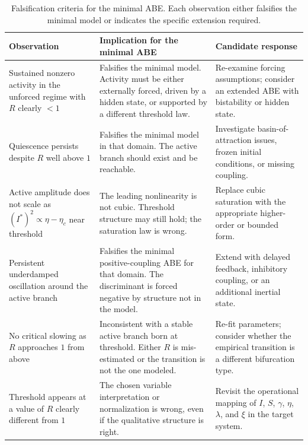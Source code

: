 \documentclass[11pt]{article}
\begin{document}
\begin{table}[H]
\centering
\small
\caption{Falsification criteria for the minimal ABE. Each observation either falsifies the minimal model or indicates the specific extension required.}
\label{tab:falsification}
\begin{tabularx}{\textwidth}{>{\raggedright\arraybackslash}p{} >{\raggedright\arraybackslash}p{} >{\raggedright\arraybackslash}X}
\toprule
\textbf{Observation} & \textbf{Implication for the minimal ABE} & \textbf{Candidate response}\\
\midrule
Sustained nonzero activity in the unforced regime with $R$ clearly $<1$ & Falsifies the minimal model. Activity must be either externally forced, driven by a hidden state, or supported by a different threshold law. & Re-examine forcing assumptions; consider an extended ABE with bistability or hidden state.\\
\addlinespace
Quiescence persists despite $R$ well above $1$ & Falsifies the minimal model in that domain. The active branch should exist and be reachable. & Investigate basin-of-attraction issues, frozen initial conditions, or missing coupling.\\
\addlinespace
Active amplitude does not scale as $(I^*)^2\propto \eta-\eta_c$ near threshold & The leading nonlinearity is not cubic. Threshold structure may still hold; the saturation law is wrong. & Replace cubic saturation with the appropriate higher-order or bounded form.\\
\addlinespace
Persistent underdamped oscillation around the active branch & Falsifies the minimal positive-coupling ABE for that domain. The discriminant is forced negative by structure not in the model. & Extend with delayed feedback, inhibitory coupling, or an additional inertial state.\\
\addlinespace
No critical slowing as $R$ approaches $1$ from above & Inconsistent with a stable active branch born at threshold. Either $R$ is mis-estimated or the transition is not the one modeled. & Re-fit parameters; consider whether the empirical transition is a different bifurcation type.\\
\addlinespace
Threshold appears at a value of $R$ clearly different from $1$ & The chosen variable interpretation or normalization is wrong, even if the qualitative structure is right. & Revisit the operational mapping of $I$, $S$, $\gamma$, $\eta$, $\lambda$, and $\xi$ in the target system.\\
\bottomrule
\end{tabularx}
\end{table}
\end{document}
